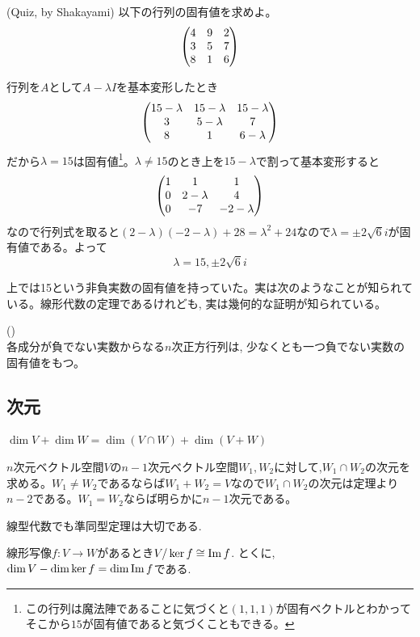 \begin{egprob} (Quiz, by Shakayami)
以下の行列の固有値を求めよ。
\[\begin{pmatrix}
4 & 9 & 2\\
3 & 5 & 7\\
8 & 1 & 6
\end{pmatrix}
\]
\end{egprob}
\begin{egans}
行列を$A$として$A- \lambda I$を基本変形したとき
\[
\begin{pmatrix}
15-\lambda & 15-\lambda & 15-\lambda\\
3 & 5-\lambda & 7\\
8 & 1 & 6-\lambda
\end{pmatrix}
\]
だから$\lambda = 15$は固有値\footnote{この行列は魔法陣であることに気づくと$(1,1,1)$が固有ベクトルとわかってそこから$15$が固有値であると気づくこともできる。}。$\lambda\neq 15$のとき上を$15-\lambda$で割って基本変形すると
\[
\begin{pmatrix}
1 & 1 & 1\\
0 & 2 - \lambda & 4\\
0 & -7 & -2 - \lambda
\end{pmatrix}
\]
なので行列式を取ると$(2-\lambda)(-2-\lambda) + 28 = \lambda^2 + 24$なので$\lambda = \pm 2\sqrt{6}i$が固有値である。よって
\[\lambda = 15, \pm 2\sqrt{6}i\]
\end{egans}
上では15という非負実数の固有値を持っていた。実は次のようなことが知られている。線形代数の定理であるけれども, 実は幾何的な証明が知られている。
\begin{theo} ()\\
各成分が負でない実数からなる$n$次正方行列は, 少なくとも一つ負でない実数の固有値をもつ。
\end{theo}










\subsection{次元}
\begin{theo}
$\dim{V} + \dim{W} = \dim{(V\cap W)} + \dim{(V+W)}$
\end{theo}
\begin{eg}
$n$次元ベクトル空間$V$の$n-1$次元ベクトル空間$W_1,W_2$に対して,$W_1\cap W_2$の次元を求める。$W_1\neq W_2$であるならば$W_1+W_2 = V$なので$W_1\cap W_2$の次元は定理より$n-2$である。$W_1=W_2$ならば明らかに$n-1$次元である。
\end{eg}
線型代数でも準同型定理は大切である.
\begin{prop}
線形写像$f:V\to W$があるとき$V/\ker{f} \cong \mathrm{Im}\,f$. とくに, $\dim{V} - \dim{\ker{f}} = \dim{\mathrm{Im}\,f}$である.
\end{prop}

